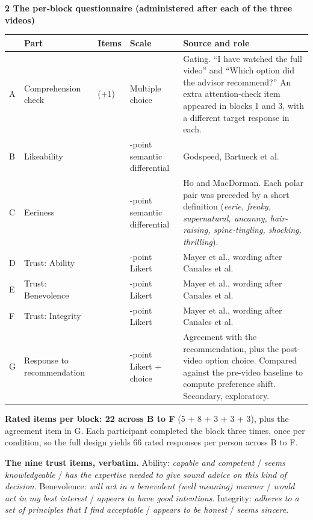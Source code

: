 \documentclass[10pt,a4paper]{article}
\newcommand{\sect}[1]{%
  \needspace{4\baselineskip}\vspace{0.7em}
  \noindent\colorbox{knblue}{\parbox{0.978\textwidth}{\vspace{1pt}\color{white}\textbf{#1}\vspace{1pt}}}
  \vspace{0.3em}\par}
\begin{document}
\sect{2 \quad The per-block questionnaire (administered after each of the three videos)}

{\small
\setlength{\tabcolsep}{5pt}\renewcommand{\arraystretch}{1.35}
\begin{tabular}{@{}>{\raggedright\arraybackslash}p{}>{\raggedright\arraybackslash}p{}>{\raggedright\arraybackslash}p{}>{\raggedright\arraybackslash}p{}>{\raggedright\arraybackslash}p{}@{}}
\toprule
& \textbf{Part} & \textbf{Items} & \textbf{Scale} & \textbf{Source and role} \\
\midrule
A & Comprehension check & 2 (+1) & Multiple choice & Gating. ``I have watched the full video'' and ``Which option did the advisor recommend?'' An extra attention-check item appeared in blocks 1 and 3, with a different target response in each. \\
B & Likeability & 5 & 5-point semantic differential & Godspeed, Bartneck et al. \\
C & Eeriness & 8 & 5-point semantic differential & Ho and MacDorman. Each polar pair was preceded by a short definition (\emph{eerie, freaky, supernatural, uncanny, hair-raising, spine-tingling, shocking, thrilling}). \\
D & Trust: Ability & 3 & 7-point Likert & Mayer et al., wording after Canales et al. \\
E & Trust: Benevolence & 3 & 7-point Likert & Mayer et al., wording after Canales et al. \\
F & Trust: Integrity & 3 & 7-point Likert & Mayer et al., wording after Canales et al. \\
G & Response to recommendation & 2 & 7-point Likert + choice & Agreement with the recommendation, plus the post-video option choice. Compared against the pre-video baseline to compute preference shift. Secondary, exploratory. \\
\bottomrule
\end{tabular}}

\vspace{0.5em}
\textbf{Rated items per block: 22 across B to F} (5 + 8 + 3 + 3 + 3), plus the agreement item in G. Each participant completed the block three times, once per condition, so the full design yields 66 rated responses per person across B to F.

\vspace{0.3em}
\textbf{The nine trust items, verbatim.} Ability: \emph{capable and competent} / \emph{seems knowledgeable} / \emph{has the expertise needed to give sound advice on this kind of decision}. Benevolence: \emph{will act in a benevolent (well meaning) manner} / \emph{would act in my best interest} / \emph{appears to have good intentions}. Integrity: \emph{adheres to a set of principles that I find acceptable} / \emph{appears to be honest} / \emph{seems sincere}.
\end{document}
